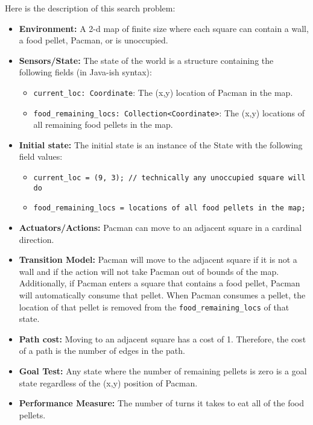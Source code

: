 \documentclass[11pt]{article}
\begin{document}
\noindent Here is the description of this search problem:
\begin{itemize}
    \item\textbf{Environment:} A 2-d map of finite size where each square can contain a wall, a food pellet, Pacman, or is unoccupied.
    \item\textbf{Sensors/State:} The state of the world is a structure containing the following fields (in Java-ish syntax):
        \begin{itemize}
            \item\texttt{current\_loc: Coordinate}: The (x,y) location of Pacman in the map.
            \item\texttt{food\_remaining\_locs: Collection<Coordinate>}: The (x,y) locations of all remaining food pellets in the map.
        \end{itemize}
    \item\textbf{Initial state:} The initial state is an instance of the State with the following field values:
        \begin{itemize}
            \item\texttt{current\_loc = (9, 3); // technically any unoccupied square will do}
            \item\texttt{food\_remaining\_locs = locations of all food pellets in the map; }
        \end{itemize}
    \item\textbf{Actuators/Actions:} Pacman can move to an adjacent square in a cardinal direction.
    \item\textbf{Transition Model:} Pacman will move to the adjacent square if it is not a wall and if the action will not take Pacman out of bounds of the map. Additionally, if Pacman enters a square that contains a food pellet, Pacman will automatically consume that pellet. When Pacman consumes a pellet, the location of that pellet is removed from the \texttt{food\_remaining\_locs} of that state.
    \item\textbf{Path cost:} Moving to an adjacent square has a cost of 1. Therefore, the cost of a path is the number of edges in the path.
    \item\textbf{Goal Test:} Any state where the number of remaining pellets is zero is a goal state regardless of the (x,y) position of Pacman.
    \item\textbf{Performance Measure:} The number of turns it takes to eat all of the food pellets.
\end{itemize}
\end{document}
